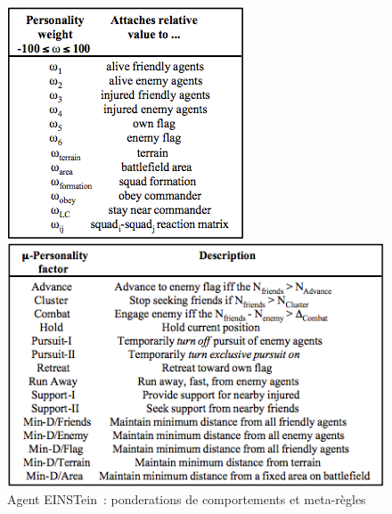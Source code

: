 \documentclass{article}
\begin{document}
\begin{center}
\begin{figure}[H]
\begin{minipage}[H]{0.35\linewidth}
	\centering
	\includegraphics[width=\textwidth]{../ressources/einstein_personality_weight}
\end{minipage}
\hfill
\begin{minipage}[H]{0.55\linewidth}
	\centering
	\includegraphics[width=\textwidth]{../ressources/einstein_personality_factor}
\end{minipage}
\caption{Agent EINSTein~: ponderations de comportements et meta-règles}
\end{figure}
\end{center}
\end{document}
